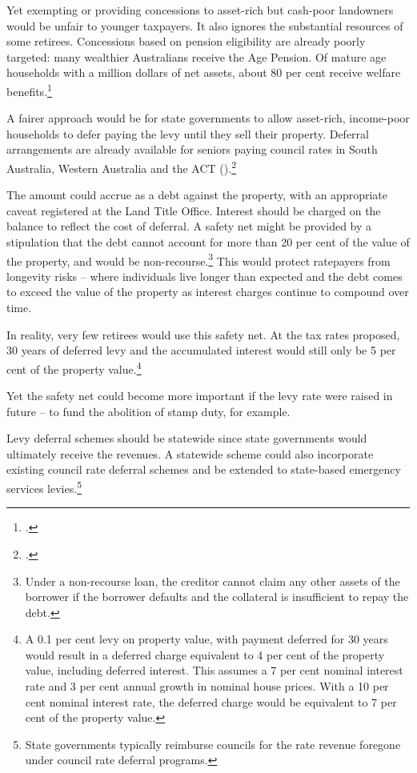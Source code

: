 \documentclass[twoside,english]{grattanBudgetRepairb5portrait}
\begin{document}
Yet exempting or providing concessions to asset-rich but cash-poor landowners would be unfair to younger taxpayers. It also ignores the substantial resources of some retirees. Concessions based on pension eligibility are already poorly targeted: many wealthier Australians receive the Age Pension. Of mature age households with a million dollars of net assets, about 80 per cent receive welfare benefits.\footcite[][37]{DaleyMcGannonSavageEtAl2013BalancingBudgets}  

A fairer approach would be for state governments to allow asset-rich, income-poor households to defer paying the levy until they sell their property. Deferral arrangements are already available for seniors paying council rates in South Australia, Western Australia and the ACT ().\footcite{Brownfield2014} 

The amount could accrue as a debt against the property, with an appropriate caveat registered at the Land Title Office. Interest should be charged on the balance to reflect the cost of deferral. A safety net might be provided by a stipulation that the debt cannot account for more than 20 per cent of the value of the property, and would be non-recourse.\footnote{Under a non-recourse loan, the creditor cannot claim any other assets of the borrower if the borrower defaults and the collateral is insufficient to repay the debt.}  This would protect ratepayers from longevity risks – where individuals live longer than expected and the debt comes to exceed the value of the property as interest charges continue to compound over time. 

In reality, very few retirees would use this safety net. At the tax rates proposed, 30 years of deferred levy and the accumulated interest would still only be 5 per cent of the property value.\footnote{A 0.1 per cent levy on property value, with payment deferred for 30 years would result in a deferred charge equivalent to 4 per cent of the property value, including deferred interest. This assumes a 7 per cent nominal interest rate and 3 per cent annual growth in nominal house prices. With a 10 per cent nominal interest rate, the deferred charge would be equivalent to 7 per cent of the property value.}  

Yet the safety net could become more important if the levy rate were raised in future -- to fund the abolition of stamp duty, for example. 

Levy deferral schemes should be statewide since state governments would ultimately receive the revenues. A statewide scheme could also incorporate existing council rate deferral schemes and be extended to state-based emergency services levies.\footnote{State governments typically reimburse councils for the rate revenue foregone under council rate deferral programs.} 
\end{document}
